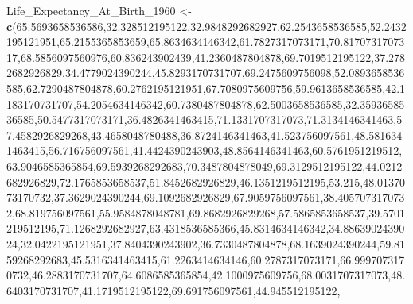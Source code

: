 \documentclass[]{article}
\newenvironment{Shaded}{\begin{snugshade}}{\end{snugshade}}
\newcommand{\DecValTok}[1]{\textcolor[rgb]{0.00,0.00,0.81}{#1}}
\newcommand{\FloatTok}[1]{\textcolor[rgb]{0.00,0.00,0.81}{#1}}
\newcommand{\KeywordTok}[1]{\textcolor[rgb]{0.13,0.29,0.53}{\textbf{#1}}}
\newcommand{\NormalTok}[1]{#1}
\newcommand{\StringTok}[1]{\textcolor[rgb]{0.31,0.60,0.02}{#1}}
\begin{document}
\begin{Shaded}
\begin{Highlighting}[]
\NormalTok{Life_Expectancy_At_Birth_}\DecValTok{1960}\NormalTok{ <-}\StringTok{ }\KeywordTok{c}\NormalTok{(}\FloatTok{65.5693658536586}\NormalTok{,}\FloatTok{32.328512195122}\NormalTok{,}\FloatTok{32.9848292682927}\NormalTok{,}\FloatTok{62.2543658536585}\NormalTok{,}\FloatTok{52.2432195121951}\NormalTok{,}\FloatTok{65.2155365853659}\NormalTok{,}\FloatTok{65.8634634146342}\NormalTok{,}\FloatTok{61.7827317073171}\NormalTok{,}\FloatTok{70.8170731707317}\NormalTok{,}\FloatTok{68.5856097560976}\NormalTok{,}\FloatTok{60.836243902439}\NormalTok{,}\FloatTok{41.2360487804878}\NormalTok{,}\FloatTok{69.7019512195122}\NormalTok{,}\FloatTok{37.2782682926829}\NormalTok{,}\FloatTok{34.4779024390244}\NormalTok{,}\FloatTok{45.8293170731707}\NormalTok{,}\FloatTok{69.2475609756098}\NormalTok{,}\FloatTok{52.0893658536585}\NormalTok{,}\FloatTok{62.7290487804878}\NormalTok{,}\FloatTok{60.2762195121951}\NormalTok{,}\FloatTok{67.7080975609756}\NormalTok{,}\FloatTok{59.9613658536585}\NormalTok{,}\FloatTok{42.1183170731707}\NormalTok{,}\FloatTok{54.2054634146342}\NormalTok{,}\FloatTok{60.7380487804878}\NormalTok{,}\FloatTok{62.5003658536585}\NormalTok{,}\FloatTok{32.3593658536585}\NormalTok{,}\FloatTok{50.5477317073171}\NormalTok{,}\FloatTok{36.4826341463415}\NormalTok{,}\FloatTok{71.1331707317073}\NormalTok{,}\FloatTok{71.3134146341463}\NormalTok{,}\FloatTok{57.4582926829268}\NormalTok{,}\FloatTok{43.4658048780488}\NormalTok{,}\FloatTok{36.8724146341463}\NormalTok{,}\FloatTok{41.523756097561}\NormalTok{,}\FloatTok{48.5816341463415}\NormalTok{,}\FloatTok{56.716756097561}\NormalTok{,}\FloatTok{41.4424390243903}\NormalTok{,}\FloatTok{48.8564146341463}\NormalTok{,}\FloatTok{60.5761951219512}\NormalTok{,}\FloatTok{63.9046585365854}\NormalTok{,}\FloatTok{69.5939268292683}\NormalTok{,}\FloatTok{70.3487804878049}\NormalTok{,}\FloatTok{69.3129512195122}\NormalTok{,}\FloatTok{44.0212682926829}\NormalTok{,}\FloatTok{72.1765853658537}\NormalTok{,}\FloatTok{51.8452682926829}\NormalTok{,}\FloatTok{46.1351219512195}\NormalTok{,}\FloatTok{53.215}\NormalTok{,}\FloatTok{48.0137073170732}\NormalTok{,}\FloatTok{37.3629024390244}\NormalTok{,}\FloatTok{69.1092682926829}\NormalTok{,}\FloatTok{67.9059756097561}\NormalTok{,}\FloatTok{38.4057073170732}\NormalTok{,}\FloatTok{68.819756097561}\NormalTok{,}\FloatTok{55.9584878048781}\NormalTok{,}\FloatTok{69.8682926829268}\NormalTok{,}\FloatTok{57.5865853658537}\NormalTok{,}\FloatTok{39.5701219512195}\NormalTok{,}\FloatTok{71.1268292682927}\NormalTok{,}\FloatTok{63.4318536585366}\NormalTok{,}\FloatTok{45.8314634146342}\NormalTok{,}\FloatTok{34.8863902439024}\NormalTok{,}\FloatTok{32.0422195121951}\NormalTok{,}\FloatTok{37.8404390243902}\NormalTok{,}\FloatTok{36.7330487804878}\NormalTok{,}\FloatTok{68.1639024390244}\NormalTok{,}\FloatTok{59.8159268292683}\NormalTok{,}\FloatTok{45.5316341463415}\NormalTok{,}\FloatTok{61.2263414634146}\NormalTok{,}\FloatTok{60.2787317073171}\NormalTok{,}\FloatTok{66.9997073170732}\NormalTok{,}\FloatTok{46.2883170731707}\NormalTok{,}\FloatTok{64.6086585365854}\NormalTok{,}\FloatTok{42.1000975609756}\NormalTok{,}\FloatTok{68.0031707317073}\NormalTok{,}\FloatTok{48.6403170731707}\NormalTok{,}\FloatTok{41.1719512195122}\NormalTok{,}\FloatTok{69.691756097561}\NormalTok{,}\FloatTok{44.945512195122}\NormalTok{,}\FloatT
\end{Highlighting}
\end{Shaded}
\end{document}
